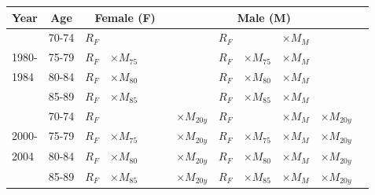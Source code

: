 \documentclass[landscape,twocolumn,letterpaper,9pt,reqno]{article}\usepackage[]{graphicx}\usepackage[]{color}
\begin{document}
\begin{tabular}{|l c | l l  l  l  | l l l l | l |}
	\hline
	Year  & Age & \multicolumn{3}{c}{Female (F)} & &   \multicolumn{3}{c}{Male (M)} & \\ 
	\hline
	& 70-74 &  $R_{F}$ & & & & $R_{F}$ & & $\times M_{M}$  & \\
	1980- & 75-79 &  $R_{F}$ & $ \times M_{75}$ & &   & $R_{F}$ & $\times M_{75}$ & $\times M_{M}$ & \\
	1984 & 80-84 & $R_{F}$ & $ \times M_{80}$ &  & &  $R_{F}$ & $ \times M_{80}$ & $ \times M_{M}$ & \\
	& 85-89 & $R_{F}$ & $ \times M_{85}$ &  & &  $R_{F}$ & $ \times M_{85}$ & $ \times M_{M}$ & \\ 
	\hline
	& 70-74 &  $R_{F}$ &  & & $\times M_{20y}$  &  $R_{F}$ & & $  \times M_{M}$  & $\times M_{20y}$\\
	2000- & 75-79 &  $R_{F} $ & $\times M_{75}$ & & $\times M_{20y}$ &  $R_{F}$ & $ \times M_{75}$ & $ \times M_{M}$& $\times M_{20y}$ \\
	2004      & 80-84 & $R_{F}$ & $ \times M_{80}$ & & $\times M_{20y}$ &   $R_{F}$ & $ \times M_{80}$ & $ \times M_{M}$ & $\times M_{20y}$ \\
	& 85-89 & $R_{F}$ & $ \times M_{85}$ & \ \ \ & $\times M_{20y}$&   $R_{F}$ & $\times M_{85}$ & $\times M_{M}$ & $\times M_{20y}$ \\
	\hline
\end{tabular}

\end{document}

